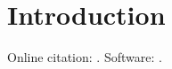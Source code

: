 \documentclass[11pt]{article}
\begin{document}
\section{Introduction}
Online citation: \cite{doe2023,dataset2022}. Software: \textcite{lineae2026}.

\printbibliography
\end{document}
